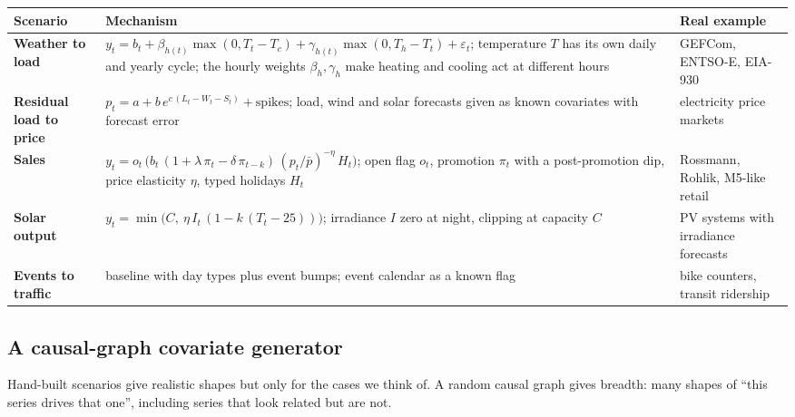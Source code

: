 \documentclass[10pt,a4paper]{article}
\begin{document}
\begin{table}[H]
\centering\small
\renewcommand{\arraystretch}{1.5}
\begin{tabularx}{\linewidth}{>{\raggedright\arraybackslash\bfseries}p{2.6cm} Y >{\raggedright\arraybackslash}p{3.2cm}}
\toprule
Scenario & Mechanism & Real example \\
\midrule
Weather to load & $y_t = b_t + \beta_{h(t)}\max(0, T_t - T_c) + \gamma_{h(t)}\max(0, T_h - T_t) + \varepsilon_t$; temperature $T$ has its own daily and yearly cycle; the hourly weights $\beta_h,\gamma_h$ make heating and cooling act at different hours & GEFCom, ENTSO-E, EIA-930 \\
Residual load to price & $p_t = a + b\, e^{c\,(L_t - W_t - S_t)} + \text{spikes}$; load, wind and solar forecasts given as known covariates with forecast error & electricity price markets \\
Sales & $y_t = o_t\,\big(b_t\,(1+\lambda\,\pi_t - \delta\,\pi_{t-k})\,(p_t/\bar p)^{-\eta}\,H_t\big)$; open flag $o_t$, promotion $\pi_t$ with a post-promotion dip, price elasticity $\eta$, typed holidays $H_t$ & Rossmann, Rohlik, M5-like retail \\
Solar output & $y_t = \min\big(C,\ \eta\, I_t\,(1 - k\,(T_t - 25))\big)$; irradiance $I$ zero at night, clipping at capacity $C$ & PV systems with irradiance forecasts \\
Events to traffic & baseline with day types plus event bumps; event calendar as a known flag & bike counters, transit ridership \\
\bottomrule
\end{tabularx}
\end{table}

\subsection{A causal-graph covariate generator}

Hand-built scenarios give realistic shapes but only for the cases we think of. A random causal graph gives breadth: many shapes of ``this series drives that one'', including series that look related but are not.
\end{document}
